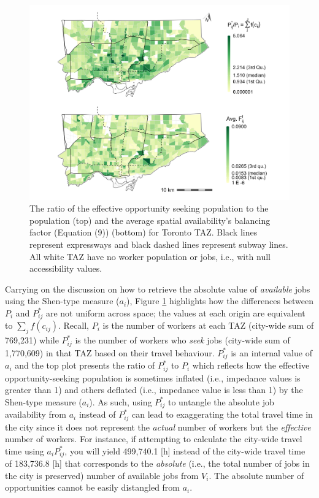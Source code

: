 \documentclass[]{elsarticle} %
\begin{document}
\begin{figure}
\includegraphics[width=1\linewidth]{images/internal-values-plot} \caption{\label{fig:internal-values-plot}  The ratio of the effective opportunity seeking population to the population (top) and the average spatial availability's balancing factor (Equation (9)) (bottom) for Toronto TAZ. Black lines represent expressways and black dashed lines represent subway lines. All white TAZ have no worker population or jobs, i.e., with null accessibility values.}\label{fig:internal-values-plot}
\end{figure}

Carrying on the discussion on how to retrieve the absolute value of
\emph{available} jobs using the Shen-type measure (\(a_i\)), Figure
\ref{fig:internal-values-plot} highlights how the differences between
\(P_i\) and \(P_{ij}^*\) are not uniform across space; the values at
each origin are equivalent to \(\sum_j f(c_{ij})\). Recall, \(P_i\) is
the number of workers at each TAZ (city-wide sum of 769,231) while
\(P_{ij}^*\) is the number of workers who \emph{seek} jobs (city-wide
sum of 1,770,609) in that TAZ based on their travel behaviour.
\(P_{ij}^*\) is an internal value of \(a_i\) and the top plot presents
the ratio of \(P_{ij}^*\) to \(P_i\) which reflects how the effective
opportunity-seeking population is sometimes inflated (i.e., impedance
values is greater than 1) and others deflated (i.e., impedance value is
less than 1) by the Shen-type measure (\(a_i\)). As such, using
\(P_{ij}^*\) to untangle the absolute job availability from \(a_i\)
instead of \(P_{ij}^*\) can lead to exaggerating the total travel time
in the city since it does not represent the \emph{actual} number of
workers but the \emph{effective} number of workers. For instance, if
attempting to calculate the city-wide travel time using
\(a_i P_{ij}^*\), you will yield 499,740.1 {[}h{]} instead of the
city-wide travel time of 183,736.8 {[}h{]} that corresponds to the
\emph{absolute} (i.e., the total number of jobs in the city is
preserved) number of available jobs from \(V_i\). The absolute number of
opportunities cannot be easily distangled from \(a_i\).
\end{document}
